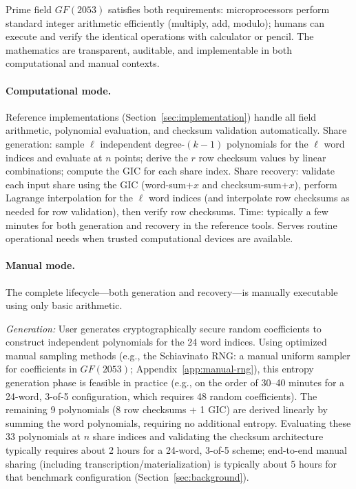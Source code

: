 \documentclass[11pt]{article}
\begin{document}
Prime field $GF(2053)$ satisfies both requirements: microprocessors perform standard integer arithmetic efficiently (multiply, add, modulo); humans can execute and verify the identical operations with calculator or pencil. The mathematics are transparent, auditable, and implementable in both computational and manual contexts.

\paragraph{Computational mode.} Reference implementations (Section~\ref{sec:implementation}) handle all field arithmetic, polynomial evaluation, and checksum validation automatically. Share generation: sample $\ell$ independent degree-$(k-1)$ polynomials for the $\ell$ word indices and evaluate at $n$ points; derive the $r$ row checksum values by linear combinations; compute the GIC for each share index. Share recovery: validate each input share using the GIC (word-sum+$x$ and checksum-sum+$x$), perform Lagrange interpolation for the $\ell$ word indices (and interpolate row checksums as needed for row validation), then verify row checksums. Time: typically a few minutes for both generation and recovery in the reference tools. Serves routine operational needs when trusted computational devices are available.

\paragraph{Manual mode.} The complete lifecycle---both generation and recovery---is manually executable using only basic arithmetic.

\textit{Generation:} User generates cryptographically secure random coefficients to construct independent polynomials for the 24 word indices. Using optimized manual sampling methods (e.g., the Schiavinato RNG: a manual uniform sampler for coefficients in $GF(2053)$; Appendix~\ref{app:manual-rng}), this entropy generation phase is feasible in practice (e.g., on the order of 30--40 minutes for a 24-word, 3-of-5 configuration, which requires 48 random coefficients). The remaining 9 polynomials (8 row checksums + 1 GIC) are derived linearly by summing the word polynomials, requiring no additional entropy. Evaluating these 33 polynomials at $n$ share indices and validating the checksum architecture typically requires about 2 hours for a 24-word, 3-of-5 scheme; end-to-end manual sharing (including transcription/materialization) is typically about 5 hours for that benchmark configuration (Section~\ref{sec:background}).
\end{document}
